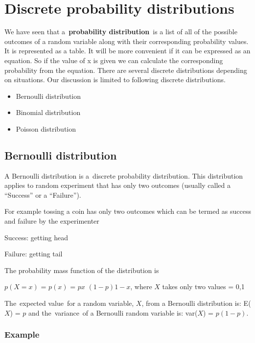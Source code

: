 \documentclass[
]{book}
\begin{document}
\hypertarget{discrete-probability-distributions}{%
\section{Discrete probability distributions}\label{discrete-probability-distributions}}

We have seen that a~\textbf{probability distribution}~is a list of all of the
possible outcomes of a random variable along with their corresponding
probability values. It is represented as a table. It will be more
convenient if it can be expressed as an equation. So if the value of x
is given we can calculate the corresponding probability from the
equation. There are several discrete distributions depending on
situations. Our discussion is limited to following discrete
distributions.

\begin{itemize}
\item
  Bernoulli distribution
\item
  Binomial distribution
\item
  Poisson distribution
\end{itemize}

\hypertarget{bernoulli-distribution}{%
\subsection{Bernoulli distribution}\label{bernoulli-distribution}}

A Bernoulli distribution is a~discrete probability distribution. This
distribution applies to random experiment that has only two outcomes
(usually called a ``Success'' or a ``Failure'').

For example tossing a coin has only two outcomes which can be termed as
success and failure by the experimenter

Success: getting head

Failure: getting tail

The probability mass function of the distribution is

\(p(X = x)\) = \(p(x)\) = \(p\)\(x\) \((1-p)\)\(1-x\), where \(X\) takes only two
values = 0,1

The~expected value~for a random variable, \(X\), from a Bernoulli
distribution is: E(\(X\)) = \(p\) and the~variance~of a Bernoulli random
variable is: var(\(X\)) = \(p(1 - p)\).

\hypertarget{example-6}{%
\subsubsection*{Example}\label{example-6}}
\end{document}
